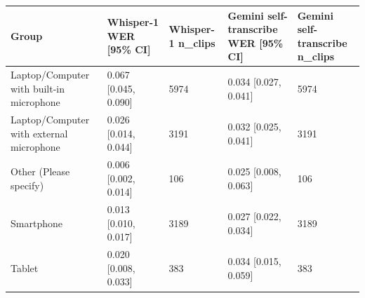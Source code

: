 \begin{tabular}{lllll}
\toprule
Group & Whisper-1 WER [95\% CI] & Whisper-1 n\_clips & Gemini self-transcribe WER [95\% CI] & Gemini self-transcribe n\_clips \\
\midrule
Laptop/Computer with built-in microphone & 0.067 [0.045, 0.090] & 5974 & 0.034 [0.027, 0.041] & 5974 \\
Laptop/Computer with external microphone & 0.026 [0.014, 0.044] & 3191 & 0.032 [0.025, 0.041] & 3191 \\
Other (Please specify) & 0.006 [0.002, 0.014] & 106 & 0.025 [0.008, 0.063] & 106 \\
Smartphone & 0.013 [0.010, 0.017] & 3189 & 0.027 [0.022, 0.034] & 3189 \\
Tablet & 0.020 [0.008, 0.033] & 383 & 0.034 [0.015, 0.059] & 383 \\
\bottomrule
\end{tabular}
